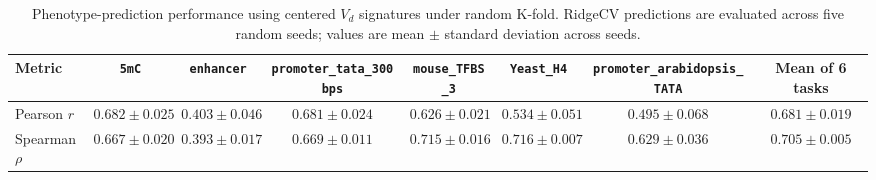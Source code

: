 \begin{table}[t]
  \centering
  \caption{Phenotype-prediction performance using centered $V_d$ signatures under random K-fold. RidgeCV predictions are evaluated across five random seeds; values are mean $\pm$ standard deviation across seeds.}
  \label{tab:fig4b_vd_kfold}
  \small
  \setlength{\tabcolsep}{4.5pt}
  \begin{tabular}{l c c c c c c c}
    \toprule
    Metric & \texttt{5mC} & \texttt{enhancer} & \texttt{promoter\_tata\_300bps} & \texttt{mouse\_TFBS\_3} & \texttt{Yeast\_H4} & \texttt{promoter\_arabidopsis\_TATA} & Mean of 6 tasks \\
    \midrule
    Pearson $r$ & $0.682 \pm 0.025$ & $0.403 \pm 0.046$ & $0.681 \pm 0.024$ & $0.626 \pm 0.021$ & $0.534 \pm 0.051$ & $0.495 \pm 0.068$ & $0.681 \pm 0.019$ \\
    Spearman $\rho$ & $0.667 \pm 0.020$ & $0.393 \pm 0.017$ & $0.669 \pm 0.011$ & $0.715 \pm 0.016$ & $0.716 \pm 0.007$ & $0.629 \pm 0.036$ & $0.705 \pm 0.005$ \\
    \bottomrule
  \end{tabular}
\end{table}
